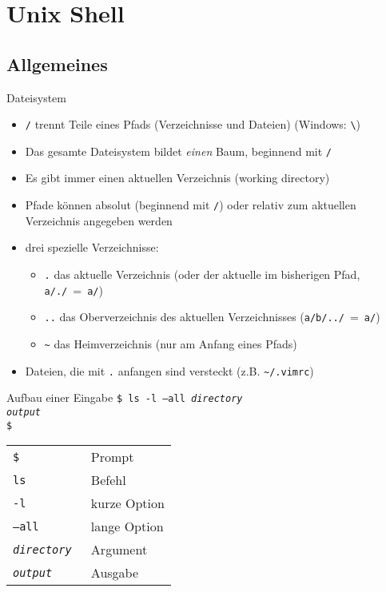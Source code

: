 \section{Unix Shell}
  \subsection{Allgemeines}
    \begin{frame}{Dateisystem}
      \begin{itemize}
        \item \texttt{/} trennt Teile eines Pfads (Verzeichnisse und Dateien) (Windows: \texttt{\textbackslash})
        \item Das gesamte Dateisystem bildet \emph{einen} Baum, beginnend mit \texttt{/}
        \item Es gibt immer einen aktuellen Verzeichnis (working directory)
        \item Pfade können absolut (beginnend mit \texttt{/}) oder relativ zum aktuellen Verzeichnis angegeben werden
        \item drei spezielle Verzeichnisse:
          \begin{itemize}
            \item \texttt{.} das aktuelle Verzeichnis (oder der aktuelle im bisherigen Pfad, \texttt{a/./}~=~\texttt{a/})
            \item \texttt{..} das Oberverzeichnis des aktuellen Verzeichnisses (\texttt{a/b/../}~=~\texttt{a/})
            \item \texttt{\textasciitilde} das Heimverzeichnis (nur am Anfang eines Pfads)
          \end{itemize}
        \item Dateien, die mit \texttt{.} anfangen sind versteckt (z.B. \texttt{\textasciitilde/.vimrc})
      \end{itemize}
    \end{frame}

    \begin{frame}{Aufbau einer Eingabe}
      \texttt{\$ ls -l --all \textit{directory}\\
              \textit{output}\\
              \$}
      \begin{center}
        \begin{tabular}{>{\tt}l l}
          \toprule
          \$                 & Prompt       \\
          ls                 & Befehl       \\
          -l                 & kurze Option \\
          --all              & lange Option \\
          \textit{directory} & Argument     \\
          \textit{output}    & Ausgabe      \\
          \bottomrule
        \end{tabular}
      \end{center}
    \end{frame}

